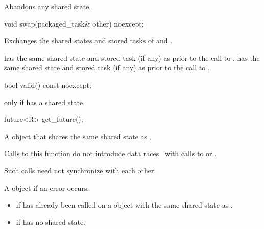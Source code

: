 \begin{itemdescr}
\pnum
\effects
Abandons any shared state.
\end{itemdescr}

%
\begin{itemdecl}
void swap(packaged_task& other) noexcept;
\end{itemdecl}

\begin{itemdescr}
\pnum
\effects
Exchanges the shared states and stored tasks of  and .

\pnum
\ensures
{} has the same shared state
and stored task (if any) as 
prior to the call to .  has the same shared state
and stored task (if any)
as  prior to the call to .
\end{itemdescr}

%
\begin{itemdecl}
bool valid() const noexcept;
\end{itemdecl}

\begin{itemdescr}
\pnum
\returns
{} only if  has a shared state.
\end{itemdescr}

%
\begin{itemdecl}
future<R> get_future();
\end{itemdecl}

\begin{itemdescr}
\pnum
\returns
A  object that shares the same shared state as .

\pnum
\sync
Calls to this function do not introduce
data races~ with calls to
 or
.
\begin{note}
Such calls need not synchronize with each other.
\end{note}

\pnum
\throws
A  object if an error occurs.

\pnum
\errors
\begin{itemize}
\item {} if  has already been called on
a  object with the same shared state as .
\item {} if  has no shared state.
\end{itemize}
\end{itemdescr}

